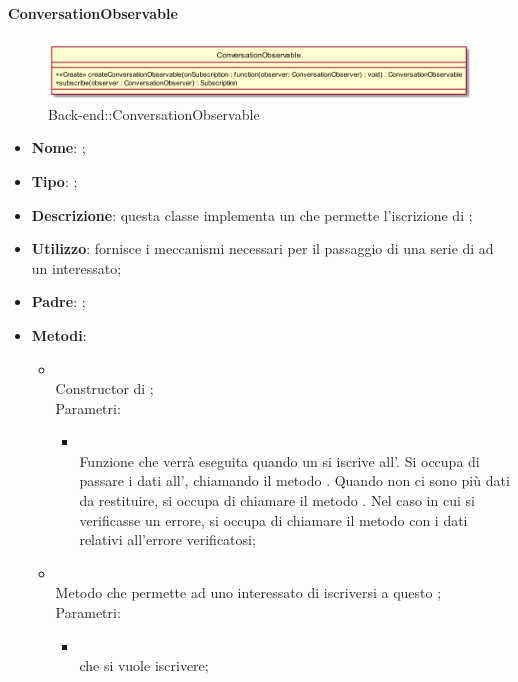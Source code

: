 \hypertarget{ConversationObservable_label}{\paragraph{ConversationObservable}}
\begin{figure}[h]
	\centering
	\includegraphics[width=\textwidth,height=\textheight,keepaspectratio]{images/ClassConversationObservable.png}
	\caption{Back-end::ConversationObservable}
\end{figure}
\begin{itemize}
	\item \textbf{Nome}: ;
	\item \textbf{Tipo}: ;
	\item \textbf{Descrizione}: questa classe implementa un  che permette l'iscrizione di ;
	\item \textbf{Utilizzo}: fornisce i meccanismi necessari per il passaggio di una serie di  ad un  interessato;
	\item \textbf{Padre}: ;
	\item \textbf{Metodi}:
	\begin{itemize}
		\item[]  \\
		Constructor di ;\\
		Parametri:
		\begin{itemize}
			\item {} \\
			Funzione che verrà eseguita quando un  si iscrive all'. Si occupa di passare i dati all', chiamando il metodo . Quando non ci sono più dati da restituire, si occupa di chiamare il metodo . Nel caso in cui si verificasse un errore, si occupa di chiamare il metodo  con i dati relativi all'errore verificatosi;
		\end{itemize}
		\item[]  \\
		Metodo che permette ad uno  interessato di iscriversi a questo ;\\
		Parametri:
		\begin{itemize}
			\item {} \\
			 che si vuole iscrivere;
		\end{itemize}
	\end{itemize}
\end{itemize}

